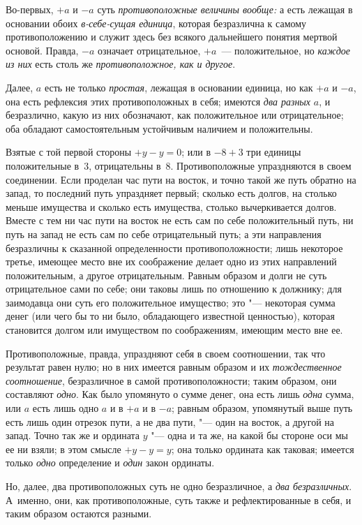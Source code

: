 Во-первых, $+a$ и $-a$ суть {\em противоположные величины вообще:}
$а$ есть лежащая в основании обоих
{\em в-себе-сущая единица}, которая безразлична к
самому противоположению и служит здесь без всякого дальнейшего понятия
мертвой основой. Правда, $-a$ означает
отрицательное, $+a$~--- положительное, но
{\em каждое из них} есть столь же {\em противоположное, как и другое}.

Далее, $a$ есть не только {\em простая}, лежащая в основании единица, но как
$+a$ и $-a$, она есть рефлексия этих противоположных в себя; имеются {\em два
разных} $a$, и безразлично, какую из них обозначают, как положительное или
отрицательное; оба обладают самостоятельным устойчивым наличием и положительны.

Взятые с той первой стороны $+y-y=0$; или в $-8+3$ три единицы положительные
в~3, отрицательны в~8. Противоположные упраздняются в своем соединении. Если
проделан час пути на восток, и точно такой же путь обратно на запад, то
последний путь упраздняет первый; сколько есть долгов, на столько меньше
имущества и сколько есть имущества, столько вычеркивается долгов. Вместе с
тем ни час пути на восток не есть сам по себе положительный путь, ни путь
на запад не есть сам по себе отрицательный путь; а эти направления
безразличны к сказанной определенности противоположности; лишь некоторое
третье, имеющее место вне их соображение делает одно из этих направлений
положительным, а другое отрицательным. Равным образом и долги не суть
отрицательное сами по себе; они таковы лишь по отношению к должнику; для
заимодавца они суть его положительное имущество; это "--- некоторая сумма
денег (или чего бы то ни было, обладающего известной ценностью), которая
становится долгом или имуществом по соображениям, имеющим место вне ее.

Противоположные, правда, упраздняют себя в своем соотношении, так что
результат равен нулю; но в них имеется равным образом и их
{\em тождественное соотношение}, безразличное в самой
противоположности; таким образом, они составляют
{\em одно}. Как было упомянуто о сумме денег, она есть
лишь {\em одна} сумма, или $a$ есть лишь одно $a$ и в $+a$ и в $-a$; равным
образом, упомянутый выше путь есть лишь один отрезок пути, а не два
пути, "--- один на восток, а другой на запад. Точно так же и ордината
$y$ "--- одна и та же, на какой бы стороне оси мы ее ни
взяли; в этом смысле $+y-y=y$; она только ордината как таковая;
имеется только {\em одно} определение и {\em один} закон ординаты.

Но, далее, два противоположных суть не одно безразличное, а
{\em два безразличных}. А~именно, они, как противоположные, суть также
и рефлектированные в себя, и таким образом остаются разными.

